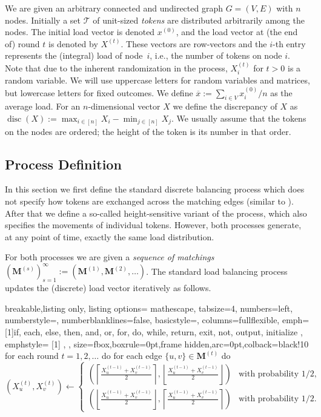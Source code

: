 \documentclass[twoside,leqno]{article}
\newcommand{\M}{\mathbf{M}}
\DeclareMathOperator{\discr}{\mathrm{disc}}
\DeclareMathOperator{\1}{\mathbf{1}}
\numberwithin{equation}{section}
\begin{document}
We are given an arbitrary connected and undirected graph $G = (V, E)$ with $n$ nodes.
Initially a set $\mathcal{T}$ of unit-sized \emph{tokens} are distributed arbitrarily among the nodes.
The initial load vector is denoted $x^{(0)}$, and the load vector at (the end of) round $t$ is denoted by $X^{(t)}$. These vectors are row-vectors and the $i$-th entry represents the (integral) load of node~$i$, i.e., the number of tokens on node $i$.
Note that due to the inherent randomization in the process, $X_i^{(t)}$ for $t > 0$ is a random variable.
We will use uppercase letters for random variables and matrices, but lowercase letters for fixed outcomes. We define $\overline{x}:= \sum_{i\in V} x_i^{(0)}/n$ as the average load.
For an $n$-dimensional vector $X$ we define the discrepancy of $X$ as $\discr(X) := \max_{i\in [n]} X_i - \min_{j\in [n]} X_j$. We usually assume that the tokens on the nodes are ordered; the height of the token is its number in that order.  

\subsection{Process Definition}
In this section we first define the standard discrete balancing process which does not specify how tokens are exchanged across the matching edges (similar to \cite{DBLP:conf/focs/RabaniSW98, DBLP:conf/focs/SauerwaldS12}). After that we define a so-called height-sensitive variant of the process, which also specifies the movements of individual tokens. However, both processes generate, at any point of time, exactly the same load distribution.  

For both processes we are given a \emph{sequence of matchings} $\left(\M^{(s)}\right)_{s=1}^{\infty}:= ( \M^{(1)},\M^{(2)},\ldots )$.
The standard load balancing process updates the (discrete) load vector iteratively as follows.
\begin{tcblisting}{breakable,listing only,
  listing options={%
     mathescape,%
     tabsize=4,%
     numbers=left,%
     numberstyle=\tiny,%
     numberblanklines=false,%
     basicstyle=\rmfamily,%
     columns=fullflexible,%
     emph={%
         [1]if, each, else, then, and, or, for, do, while, return, exit, not, output, initialize %
         },
     emphstyle={%
         [1]\bfseries%
         },%
},
size=fbox,boxrule=0pt,frame hidden,arc=0pt,colback=black!10}
for each round $t=1,2,\ldots $ do
    for each edge $\{u,v\} \in \M^{(t)} $ do
        $\displaystyle \left(X^{(t)}_u,X^{(t)}_v\right) \gets \begin{cases} \left(\left\lceil\frac{X^{(t-1)}_u+X^{(t-1)}_v}{2}\right\rceil, \left\lfloor\frac{X^{(t-1)}_u+X^{(t-1)}_v}{2}\right\rfloor\right) & \text{with probability } 1/2, \\[1ex]     \left(\left\lfloor\frac{X^{(t-1)}_u+X^{(t-1)}_v}{2}\right\rfloor, \left\lceil\frac{X^{(t-1)}_u+X^{(t-1)}_v}{2}\right\rceil\right) & \text{with probability } 1/2 .    \end{cases}$
\end{tcblisting}
\end{document}

